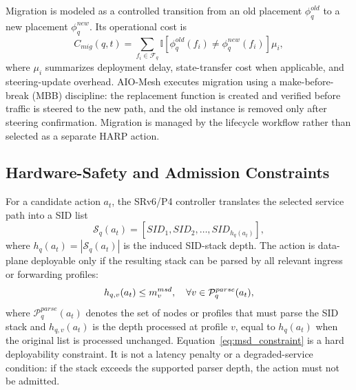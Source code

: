 \documentclass[final,5p]{elsarticle}
\newcommand{\rev}[1]{\textcolor{revisiongreen}{#1}}
\begin{document}
Migration is modeled as a controlled transition from an old placement \(\phi_q^{old}\) to a new placement \(\phi_q^{new}\). Its operational cost is
\begin{equation}
C_{mig}(q,t)=\sum_{f_i\in\mathcal{F}_q}\mathbb{I}\!\left[\phi_q^{old}(f_i)\neq\phi_q^{new}(f_i)\right]\mu_i,
\end{equation}
where \(\mu_i\) summarizes deployment delay, state-transfer cost when applicable, and steering-update overhead. AIO-Mesh executes migration using a \rev{make-before-break (MBB)} discipline: the replacement function is created and verified before traffic is steered to the new path, and the old instance is removed only after steering confirmation. \rev{Migration is managed by the lifecycle workflow rather than selected as a separate HARP action.}

\subsection{Hardware-Safety and Admission Constraints}
\label{subsec:hardware_constraint_model}

For a candidate action \(a_t\), the SRv6/P4 controller translates the selected service path into a SID list
\begin{equation}
\mathcal{S}_q(a_t)=[SID_1,SID_2,\ldots,SID_{h_q(a_t)}],
\end{equation}
where \(h_q(a_t)=|\mathcal{S}_q(a_t)|\) is the induced SID-stack depth. The action is data-plane deployable only if the resulting stack can be parsed by all relevant ingress or forwarding profiles:
\begin{equation}
\rev{h_{q,v}(a_t)\le m_v^{msd},\quad\forall v\in\mathcal{P}^{parse}_q(a_t),}
\label{eq:msd_constraint}
\end{equation}
where \(\mathcal{P}^{parse}_q(a_t)\) denotes the set of nodes or profiles that must parse the SID stack \rev{and \(h_{q,v}(a_t)\) is the depth processed at profile \(v\), equal to \(h_q(a_t)\) when the original list is processed unchanged}. Equation~\eqref{eq:msd_constraint} is a hard deployability constraint. It is not a latency penalty or a degraded-service condition: if the stack exceeds the supported parser depth, the action must not be admitted.
\end{document}
